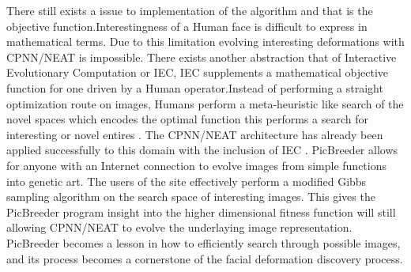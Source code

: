 There still exists a issue to implementation of the algorithm and that is the objective function.Interestingness of a Human face is 
difficult to express in mathematical terms. Due to this limitation evolving interesting deformations with CPNN/NEAT is impossible.
There exists another abstraction that of Interactive Evolutionary Computation or IEC, IEC supplements a mathematical objective function
for one driven by a Human operator.Instead of performing a straight optimization route on images, Humans perform a meta-heuristic like search of the novel
spaces which encodes the optimal function this performs a search for interesting or novel entires \cite{lehman2010efficiently} \cite{li2009innovative}.  The CPNN/NEAT architecture has already been applied 
successfully to this domain with the inclusion of IEC \cite{secretan2008picbreeder}. PicBreeder allows for anyone with an Internet connection to evolve images from simple functions
into genetic art. The users of the site effectively perform a modified Gibbs sampling algorithm on the search space of interesting images.
This gives the PicBreeder program insight into the higher dimensional fitness function will still allowing CPNN/NEAT to evolve the underlaying
image representation. PicBreeder becomes a lesson in how to efficiently search through possible images, and its process becomes a cornerstone
of the facial deformation discovery process.